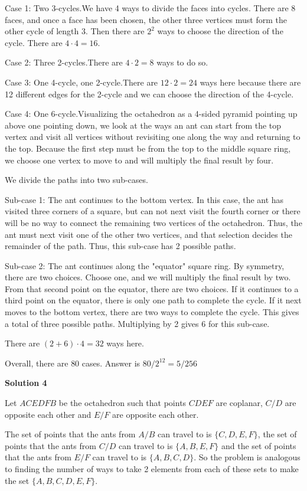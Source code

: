 \begin{enumerate}
 Case 1: Two 3-cycles.We have 4 ways to divide the faces into cycles. There are 8 faces, and once a face has been chosen, the other three vertices must form the other cycle of length 3. Then there are $2^2$ ways to choose the direction of the cycle.  There are $4 \cdot 4 = 16.$ 

 Case 2: Three 2-cycles.There are $4 \cdot 2 = 8$ ways to do so. 

 Case 3: One 4-cycle, one 2-cycle.There are $12 \cdot 2 = 24$ ways here because there are 12 different edges for the 2-cycle and we can choose the direction of the 4-cycle. 

 Case 4: One 6-cycle.Visualizing the octahedron as a 4-sided pyramid pointing up above one pointing down, we look at the ways an ant can start from the top vertex and visit all vertices without revisiting one along the way and returning to the top. Because the first step must be from the top to the middle square ring, we choose one vertex to move to and will multiply the final result by four.

 We divide the paths into two sub-cases.

 Sub-case 1: The ant continues to the bottom vertex.  In this case, the ant has visited three corners of a square, but can not next visit the fourth corner or there will be no way to connect the remaining two vertices of the octahedron.  Thus, the ant must next visit one of the other two vertices, and that selection decides the remainder of the path.  Thus, this sub-case has 2 possible paths.

 Sub-case 2: The ant continues along the "equator" square ring. By symmetry, there are two choices.  Choose one, and we will multiply the final result by two.  From that second point on the equator, there are two choices.  If it continues to a third point on the equator, there is only one path to complete the cycle.  If it next moves to the bottom vertex, there are two ways to complete the cycle. This gives a total of three possible paths.  Multiplying by 2 gives 6 for this sub-case.

 There are $(2 + 6) \cdot 4 = 32$ ways here. 

 Overall, there are $80$ cases.  Answer is $80/2^{12} = 5/256$




\textbf{Solution 4}

Let $ACEDFB$ be the octahedron such that points $CDEF$ are coplanar, $C/D$ are opposite each other and $E/F$ are opposite each other.

 The set of points that the ants from $A/B$ can travel to is $\{C,D,E,F\}$, the set of points that the ants from $C/D$ can travel to is $\{A,B,E,F\}$ and the set of points that the ants from $E/F$ can travel to is $\{A,B,C,D\}$. So the problem is analogous to finding the number of ways to take 2 elements from each of these sets to make the set $\{A,B,C,D,E,F\}$.


\end{enumerate}
